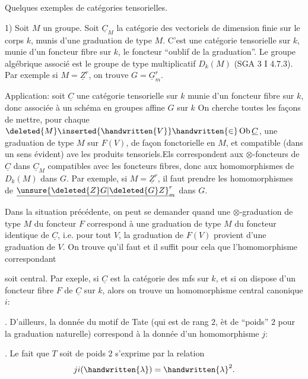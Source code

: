 
Quelques exemples de catégories tensorielles.

1) Soit $M$ un groupe. Soit $\underline{C}_M$ la catégorie des vectoriels de dimension finie sur le corps $k$, munis d'une graduation de type $M$. C'est une catégorie tensorielle sur $k$, munie d'un foncteur fibre sur $k$, le foncteur ``oublif de la graduation''. Le groupe algébrique associé est le groupe de type multiplicatif $D_k(M)$ (SGA 3 I 4.7.3). Par exemple si $M=\underline{Z}^r$, on trouve $G=\underline{G}_m^r$.

Application: soit $\underline{C}$ une catégorie tensorielle sur $k$ munie d'un foncteur fibre  sur $k$, donc associée à un schéma en groupes affine $G$ sur $k$ On cherche toutes les façons de mettre, pour chaque $\deleted{M}\inserted{\handwritten{V}}\handwritten{\in}\operatorname{Ob}\underline{C}$, une graduation de type $M$ sur $F(V)$, de façon fonctorielle en $M$, et compatible (dans un sens évident) ave les produits tensoriels.Els correspondent aux $\otimes$-foncteurs de $\underline{C}$ dans $\underline{C}_M$ compatibles avec les foncteurs fibres, donc aux homomorphismes de $D_k(M)$ dans $G$. Par exemple, si $M=\underline{Z}^r$, il faut prendre les homomorphismes de $\underline{\unsure{\deleted{Z}G|\deleted{G}Z}}_m^r$ dans $G$.

Dans la situation précédente, on peut se demander quand une $\otimes$-graduation de type $M$ du foncteur $F$ correspond à une graduation de type $M$ du foncteur identique de $\underline{C}$, i.e. pour tout $V$, la graduation de $F(V)$ provient d'une graduation de $V$. On trouve qu'il faut et il suffit pour cela que l'homomorphisme correspondant  soit central. Par exeple, si $\underline{C}$ est la catégorie des mfs sur $k$, et si on dispose d'un foncteur fibre $F$ de $\underline{C}$ sur $k$, alors on trouve un homomorphisme central canonique $i:$. D'ailleurs, la donnée du motif de Tate (qui est de rang $2$, èt de ``poids'' $2$ pour la graduation naturelle) correspond à  la donnée d'un homomorphisme $j:$. Le fait que $T$ soit de poids $2$ s'exprime par la relation
\[
ji(\handwritten{\lambda})=\handwritten{\lambda}^{2}.
\]

